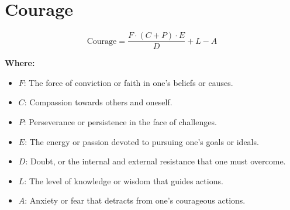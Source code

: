 \chapter{Courage}

\begin{equation}
\text{Courage} = \frac{F \cdot (C + P) \cdot E}{D} + L - A
\end{equation}

\textbf{Where:}

\begin{itemize}
    \item $F$: The force of conviction or faith in one's beliefs or causes.
    \item $C$: Compassion towards others and oneself.
    \item $P$: Perseverance or persistence in the face of challenges.
    \item $E$: The energy or passion devoted to pursuing one's goals or ideals.
    \item $D$: Doubt, or the internal and external resistance that one must overcome.
    \item $L$: The level of knowledge or wisdom that guides actions.
    \item $A$: Anxiety or fear that detracts from one's courageous actions.
\end{itemize}